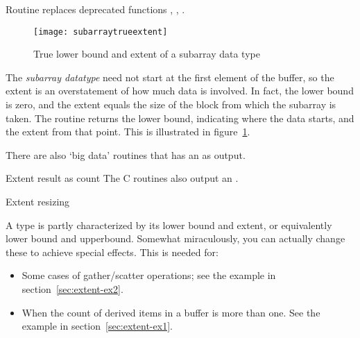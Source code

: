 \begin{remark}
  Routine 
  replaces
  deprecated functions ,
  , .
\end{remark}

\begin{figure}[ht]
  \texttt{[image: subarraytrueextent]}
  \caption{True lower bound and extent of a subarray data type}
  \label{fig:subtrue}
\end{figure}

The \emph{subarray datatype} need not
start at the first element of the buffer, so the extent is an
overstatement of how much data is involved.
In fact, the lower bound is zero,
and the extent equals the size of the block
from which the subarray is taken.
The routine
 returns the lower bound,
indicating where the data starts, and the extent from that point.
This is illustrated in figure~\ref{fig:subtrue}.


\begin{comment}
  Suppose we implement gather (see also Section Gather ) as a spanning
  tree implemented on top of point-to-point routines. Since the receive
  buffer is only valid on the root process, one will need to allocate
  some temporary space for receiving data on intermediate
  nodes. However, the datatype extent cannot be used as an estimate of
  the amount of space that needs to be allocated, if the user has
  modified the extent, for example by using MPI_TYPE_CREATE_RESIZED. The
  functions MPI_TYPE_GET_TRUE_EXTENT and MPI_TYPE_GET_TRUE_EXTENT_X are
  provided which return the true extent of the datatype.
\end{comment}

There are also `big data' routines
that has an  as output.

\begin{mpifournote}{Extent result as count}
  The C routines
  also output an .
\end{mpifournote}

 {Extent resizing}

A type is partly characterized by its lower bound and extent,
or equivalently lower bound and upperbound.
Somewhat miraculously, you can actually change these to achieve special effects.
This is needed for:
\begin{itemize}
\item
  Some cases of gather/scatter operations;
  see the example in section~\ref{sec:extent-ex2}.
\item When the count
  of derived items in a buffer is more than one.
  See the example in section~\ref{sec:extent-ex1}.
\end{itemize}


